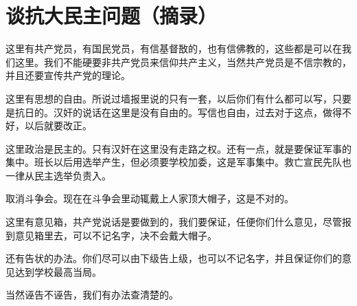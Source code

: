 \section[谈抗大民主问题（摘录）（一九三八年）]{谈抗大民主问题（摘录）}


这里有共产党员，有国民党员，有信基督敔的，也有信佛教的，这些都是可以在我们这里。我们不能硬要非共产党员来信仰共产主义，当然共产党员是不信宗教的，并且还要宣传共产党的理论。

这里有思想的自由。所说过墙报里说的只有一套，以后你们有什么都可以写，只要是抗日的。汉奸的说话在这里是没有自由的。写信也自由，过去对于这点，做得不好，以后就要改正。

这里政治是民主的。只有汉奸在这里没有走路之权。还有一点，就是要保证军事的集中。班长以后用选举产生，但必须要学校加委，这是军事集中。救亡宣民先队也一律从民主选举负责入。

取消斗争会。现在在斗争会里动辄戴上人家顶大帽子，这是不对的。

这里有意见箱，共产党说话是要做到的，我们要保证，任便你们什么意见，尽管报到意见箱里去，可以不记名字，决不会戴大帽子。

还有告状的办法。你们尽可以由下级告上级，也可以不记名字，并且保证你们的意见达到学校最高当局。

当然诬告不诬告，我们有办法查清楚的。

